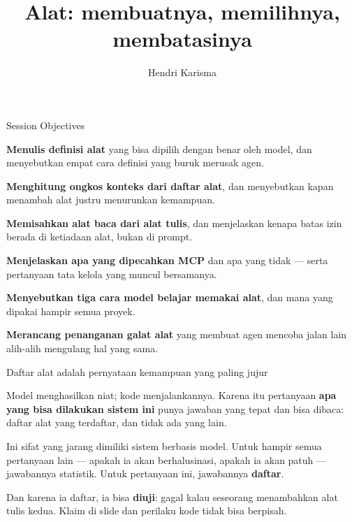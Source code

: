\documentclass[aspectratio=169,11pt,t]{beamer}
\title{Alat: membuatnya, memilihnya, membatasinya}
\author{Hendri Karisma}
\date{}
\begin{document}
\covertitle

\begin{frame}[shrink=25]{Session Objectives}
\begin{isteps}
\item \textbf{Menulis definisi alat} yang bisa dipilih dengan benar oleh model, dan menyebutkan empat cara definisi yang buruk merusak agen.
\item \textbf{Menghitung ongkos konteks dari daftar alat}, dan menyebutkan kapan menambah alat justru menurunkan kemampuan.
\item \textbf{Memisahkan alat baca dari alat tulis}, dan menjelaskan kenapa batas izin berada di ketiadaan alat, bukan di prompt.
\item \textbf{Menjelaskan apa yang dipecahkan MCP} dan apa yang tidak --- serta pertanyaan tata kelola yang muncul bersamanya.
\item \textbf{Menyebutkan tiga cara model belajar memakai alat}, dan mana yang dipakai hampir semua proyek.
\item \textbf{Merancang penanganan galat alat} yang membuat agen mencoba jalan lain alih-alih mengulang hal yang sama.
\end{isteps}

\vskip 6pt
\vskip 4pt
\vskip 2pt
\end{frame}


\begin{frame}[shrink=25]{Daftar alat adalah pernyataan kemampuan yang paling jujur}
{\fontsize{9.4}{12.6}\selectfont\color{fg2}Model menghasilkan niat; kode menjalankannya. Karena itu pertanyaan \textbf{apa yang bisa dilakukan sistem ini} punya jawaban yang tepat dan bisa dibaca: daftar alat yang terdaftar, dan tidak ada yang lain.\par}\vskip 4pt
{\fontsize{9.4}{12.6}\selectfont\color{fg2}Ini sifat yang jarang dimiliki sistem berbasis model. Untuk hampir semua pertanyaan lain --- apakah ia akan berhalusinasi, apakah ia akan patuh --- jawabannya statistik. Untuk pertanyaan ini, jawabannya \textbf{daftar}.\par}\vskip 4pt
\begin{iband}[signal]
Dan karena ia daftar, ia bisa \textbf{diuji}:  gagal kalau seseorang menambahkan alat tulis kedua. Klaim di slide dan perilaku kode tidak bisa berpisah.
\end{iband}
\end{frame}
\end{document}
